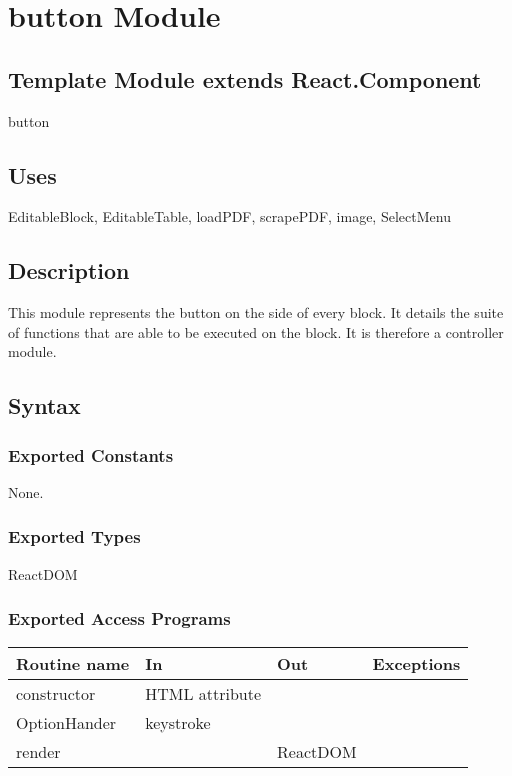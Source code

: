 \documentclass[12pt, titlepage]{article}
\begin{document}
\newpage

\section{button Module}

\subsection{Template Module extends React.Component}

button

\subsection{Uses}

EditableBlock, EditableTable, loadPDF, scrapePDF, image, SelectMenu

\subsection{Description}
This module represents the button on the side of every block. It details the suite of functions that are able to be executed on the block. It is therefore a controller module.

\subsection{Syntax}

\subsubsection{Exported Constants}

None.

\subsubsection{Exported Types}

ReactDOM

\subsubsection{Exported Access Programs}

\begin{tabular}{| l | l | l | l |}
  \hline
  \textbf{Routine name} & \textbf{In} & \textbf{Out} & \textbf{Exceptions}\\
  \hline
  constructor & HTML attribute & ~ & ~\\
  \hline
  OptionHander & keystroke & ~ & ~\\
  \hline
  render & ~ & ReactDOM & ~\\
  \hline
\end{tabular}
\end{document}
